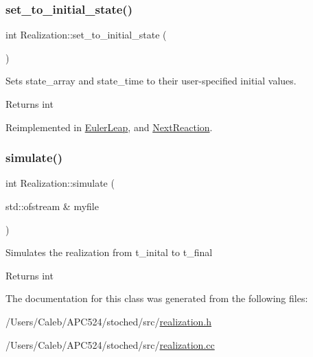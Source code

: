 \subsubsection{\texorpdfstring{set\+\_\+to\+\_\+initial\+\_\+state()}{set\_to\_initial\_state()}}
{\footnotesize\ttfamily int Realization\+::set\+\_\+to\+\_\+initial\+\_\+state (\begin{DoxyParamCaption}{ }\end{DoxyParamCaption})\hspace{0.3cm}{\ttfamily [virtual]}}



Sets state\+\_\+array and state\+\_\+time to their user-\/specified initial values. 

\begin{DoxyReturn}{Returns}
int 
\end{DoxyReturn}


Reimplemented in \hyperlink{class_euler_leap_a1a13929ea1ebf40e7357439968828f4b}{Euler\+Leap}, and \hyperlink{class_next_reaction_a0cc63c4ec9fe3f338472fff302f6d746}{Next\+Reaction}.

\mbox{\label{class_realization_a4e21bc7355e33c17d1401736b3c62413}} 
\subsubsection{\texorpdfstring{simulate()}{simulate()}}
{\footnotesize\ttfamily int Realization\+::simulate (\begin{DoxyParamCaption}\item[{std\+::ofstream \&}]{myfile }\end{DoxyParamCaption})}

Simulates the realization from t\+\_\+inital to t\+\_\+final

\begin{DoxyReturn}{Returns}
int 
\end{DoxyReturn}


The documentation for this class was generated from the following files\+:\begin{DoxyCompactItemize}
\item 
/\+Users/\+Caleb/\+A\+P\+C524/stoched/src/\hyperlink{realization_8h}{realization.\+h}\item 
/\+Users/\+Caleb/\+A\+P\+C524/stoched/src/\hyperlink{realization_8cc}{realization.\+cc}\end{DoxyCompactItemize}
